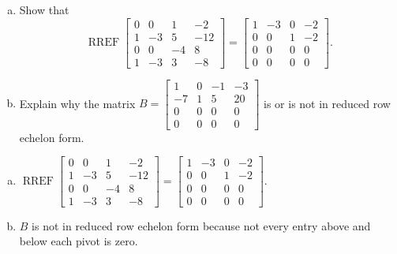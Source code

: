 
\begin{exerciseStatement}

\begin{enumerate}[(a)]
\item Show that \[\operatorname{RREF} \left[\begin{array}{cccc}
0 & 0 & 1 & -2 \\
1 & -3 & 5 & -12 \\
0 & 0 & -4 & 8 \\
1 & -3 & 3 & -8
\end{array}\right] = \left[\begin{array}{cccc}
1 & -3 & 0 & -2 \\
0 & 0 & 1 & -2 \\
0 & 0 & 0 & 0 \\
0 & 0 & 0 & 0
\end{array}\right] .\]
\item Explain why the matrix \(B= \left[\begin{array}{cccc}
1 & 0 & -1 & -3 \\
-7 & 1 & 5 & 20 \\
0 & 0 & 0 & 0 \\
0 & 0 & 0 & 0
\end{array}\right] \) is or is not in reduced row echelon form.
\end{enumerate}
    
\end{exerciseStatement}
    
\begin{exerciseAnswer} 

\begin{enumerate}[(a)]
\item \(\operatorname{RREF} \left[\begin{array}{cccc}
0 & 0 & 1 & -2 \\
1 & -3 & 5 & -12 \\
0 & 0 & -4 & 8 \\
1 & -3 & 3 & -8
\end{array}\right] = \left[\begin{array}{cccc}
1 & -3 & 0 & -2 \\
0 & 0 & 1 & -2 \\
0 & 0 & 0 & 0 \\
0 & 0 & 0 & 0
\end{array}\right] .\)
\item \(B\) is not in reduced row echelon form because not every entry above and below each pivot is zero. 
\end{enumerate}
    
\end{exerciseAnswer}
    
